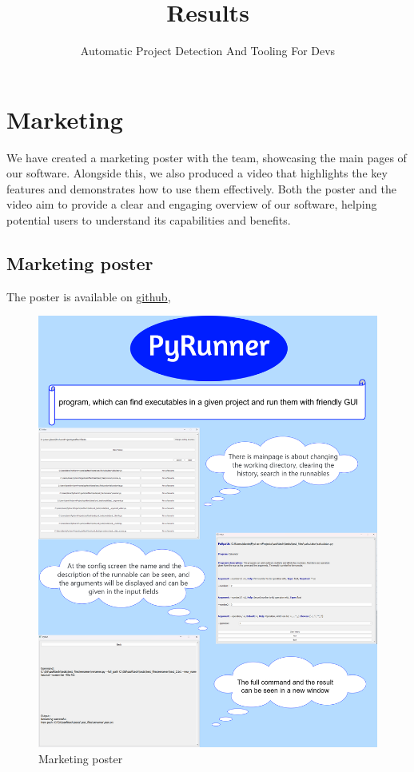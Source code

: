 \documentclass{article}
\title{Results}
\author{Automatic Project Detection And Tooling For Devs}
\date{}
\begin{document}
\maketitle

\clearpage

\section{Marketing}

We have created a marketing poster with the team, showcasing the main pages of our software. Alongside this, we also produced a video that highlights the key features and demonstrates how to use them effectively. Both the poster and the video aim to provide a clear and engaging overview of our software, helping potential users to understand its capabilities and benefits.

\subsection{Marketing poster}
The poster is available on \href{https://github.com/CsullogBeni/szofttech/blob/main/documentation/img/poster.png}{github},
\begin{figure}[h!]
    \centering
    \includegraphics[width=0.8\linewidth]{img/poster.png}
    \caption{Marketing poster}
    \label{fig:enter-label}
\end{figure}
\end{document}
